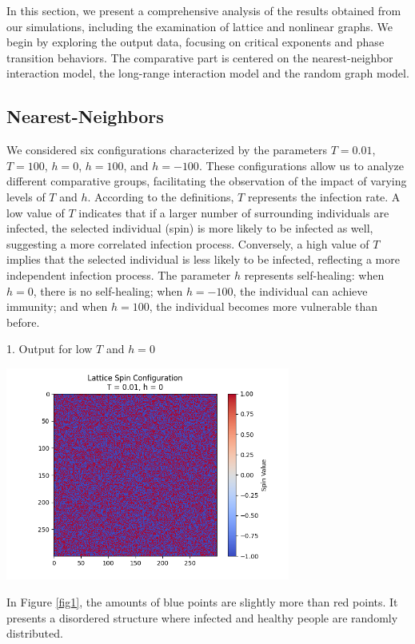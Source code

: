 \documentclass[11pt]{book}
\begin{document}
In this section, we present a comprehensive analysis of the results obtained from our simulations, including the examination of lattice and nonlinear graphs. We begin by exploring the output data, focusing on critical exponents and phase transition behaviors. The comparative part is centered on the nearest-neighbor interaction model, the long-range interaction model and the random graph model. 
\subsection{Nearest-Neighbors}

We considered six configurations characterized by the parameters $T = 0.01$, $T = 100$, $h = 0$, $h = 100$, and $h = -100$. These configurations allow us to analyze different comparative groups, facilitating the observation of the impact of varying levels of $T$ and $h$.
According to the definitions, $T$ represents the infection rate. A low value of $T$ indicates that if a larger number of surrounding individuals are infected, the selected individual (spin) is more likely to be infected as well, suggesting a more correlated infection process. Conversely, a high value of $T$ implies that the selected individual is less likely to be infected, reflecting a more independent infection process. The parameter $h$ represents self-healing: when $h = 0$, there is no self-healing; when $h = -100$, the individual can achieve immunity; and when $h = 100$, the individual becomes more vulnerable than before. 

1. Output for low $T$ and $h=0$
\begin{center}
\captionsetup{type=figure}
    \includegraphics[width=0.7\textwidth]{nn, T=0.01, h=0.png}
    \label{fig1}
\end{center}
 In Figure \eqref{fig1}, the amounts of blue points are slightly more than red points. It presents a disordered structure where infected and healthy people are randomly distributed.
 
\end{document}

